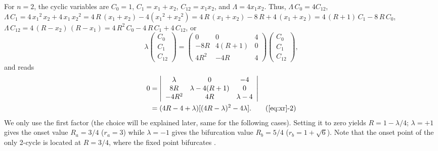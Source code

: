 \documentclass[preprint]{revtex4-1}
\begin{document}
For $n = 2$, the cyclic variables are
$C_0 = 1$,
$C_1 = x_1 + x_2$,
$C_{12} = x_1 x_2$,
and $\Lambda = 4 x_1 x_2$.
Thus,
$\Lambda \, C_0 = 4 C_{12}$,
$\Lambda \, C_1 = 4 \, {x_1}^2 \, x_2 + 4 \, x_1 \, {x_2}^2
  = 4 \, R \, (x_1 + x_2) - 4 ({x_1}^2 + {x_2}^2)
  = 4 \, R \, (x_1 + x_2) - 8 \, R + 4 \, (x_1 + x_2)
  = 4 \, (R + 1) \, C_1 - 8 \, R \, C_0$,
$\Lambda \, C_{12}
  = 4 \, (R-x_2)\, (R-x_1)
  = 4\, R^2  \, C_0 - 4 \, R \, C_1 + 4 \, C_{12}$,
or
\[
\lambda
  \left( \begin{array}{c}
  C_0 \\
  C_1 \\
  C_{12}
  \end{array} \right)
 =
  \left( \begin{array}{ccc}
  0           & 0         & 4 \\
  -8R         & 4(R+1)    & 0 \\
  4R^2        & -4R       & 4
  \end{array} \right)
  \left( \begin{array}{c}
  C_0 \\
  C_1 \\
  C_{12}
  \end{array} \right),
\]
%
%
%
and  reads
%
%
%
\begin{align}
0 &=
  \left| \begin{array}{ccc}
  \lambda     & 0               & -4 \\
  8R          & \lambda-4(R+1)  & 0 \\
  -4R^2       & 4R              & \lambda-4
  \end{array} \right| \nonumber\\
  &= (4R - 4 + \lambda) [(4 R-\lambda)^2 - 4 \lambda].
  \tag{\ref{eq:xr}-2}
\label{eq:xr2}
\end{align}
%
%
%
We only use the first factor
(the choice will be explained later, same for the following cases).
%
Setting it to zero yields $R = 1 - \lambda/4$;
$\lambda = +1$ gives the onset value $R_a = 3/4$ ($r_a = 3$)
while
$\lambda = -1$ gives the bifurcation value $R_b = 5/4$ ($r_b = 1+\sqrt 6$).
%
Note that the onset point of the only 2-cycle
  is located at $R = 3/4$,
  where the fixed point bifurcates \cite{strogatz}
  .
\end{document}
